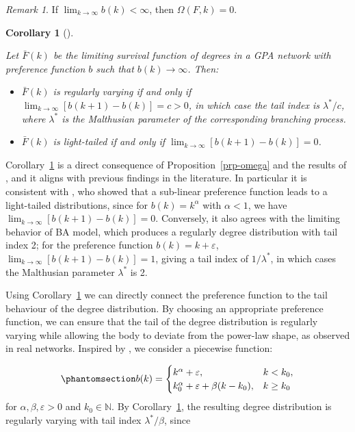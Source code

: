 \documentclass[
  sn-basic,
]{sn-jnl}
\theoremstyle{plain}
\newtheorem{corollary}{Corollary}[section]
\theoremstyle{plain}
\theoremstyle{remark}
\newtheorem{refremark}{Remark}[section]
\begin{document}
\begin{refremark}
If \(\lim_{k\rightarrow\infty}b(k)<\infty\), then \(\Omega(F, k) = 0\).

\label{rem-omega}

\end{refremark}

\begin{corollary}[]\protect\hypertarget{cor-omega2}{}\label{cor-omega2}

Let \(\bar F (k)\) be the limiting survival function of degrees in a GPA
network with preference function \(b\) such that
\(b(k)\rightarrow\infty\). Then:

\begin{itemize}
\item
  \(\bar F(k)\) is regularly varying if and only if
  \(\lim_{k\rightarrow\infty}[b(k+1)-b(k)]=c>0\), in which case the tail
  index is \(\lambda^*/c\), where \(\lambda^*\) is the Malthusian
  parameter of the corresponding branching process.
\item
  \(\bar F(k)\) is light-tailed if and only if
  \(\lim_{k\rightarrow\infty}[b(k+1)-b(k)]=0\).
\end{itemize}

\end{corollary}

Corollary~\ref{cor-omega2} is a direct consequence of
Proposition~\ref{prp-omega} and the results of \citet{shimura12}, and it
aligns with previous findings in the literature. In particular it is
consistent with \citet{krapivsky01}, who showed that a sub-linear
preference function leads to a light-tailed distributions, since for
\(b(k)=k^\alpha\) with \(\alpha<1\), we have
\(\lim_{k\rightarrow\infty}[b(k+1)-b(k)]=0\). Conversely, it also agrees
with the limiting behavior of BA model, which produces a regularly
degree distribution with tail index 2; for the preference function
\(b(k)=k+\varepsilon\), \(\lim_{k\rightarrow\infty}[b(k+1)-b(k)]=1\),
giving a tail index of \(1/\lambda^*\), in which cases the Malthusian
parameter \(\lambda^*\) is 2.

Using Corollary~\ref{cor-omega2} we can directly connect the preference
function to the tail behaviour of the degree distribution. By choosing
an appropriate preference function, we can ensure that the tail of the
degree distribution is regularly varying while allowing the body to
deviate from the power-law shape, as observed in real networks. Inspired
by \citet{Lee24}, we consider a piecewise function:

\begin{equation}\phantomsection\label{eq-pref}{
b(k) = \begin{cases}
k^\alpha + \varepsilon,&k<k_0,\\
k_0^\alpha + \varepsilon + \beta(k-k_0), &k\ge k_0
\end{cases}
}\end{equation} for \(\alpha,\beta, \varepsilon>0\) and
\(k_0\in\mathbb N\). By Corollary~\ref{cor-omega2}, the resulting degree
distribution is regularly varying with tail index \(\lambda^*/\beta\),
since
\end{document}
